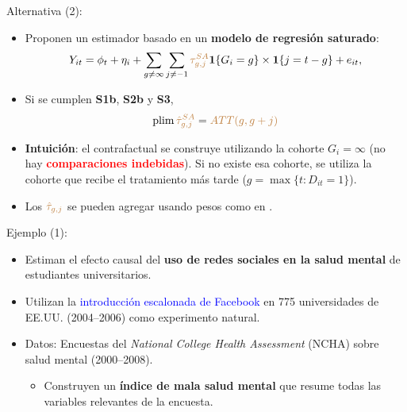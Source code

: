 \documentclass[10pt, xcolor=dvipsnames]{beamer}
\begin{document}
\begin{frame}{Alternativa (2): \citet{sun_estimating_2021}}
\begin{itemize}\setlength{\itemsep}{1em}
    \item  Proponen un estimador basado en un \textbf{modelo de regresión saturado}:
    \begin{align*}
        Y_{it} = \phi_t + \eta_i + \sum_{g \neq \infty} \sum_{j \neq -1} \textcolor{brown}{\tau^{SA}_{g,j}} \mathbf{1}\{G_i = g\} \times \mathbf{1}\{j=t-g\} + e_{it},
    \end{align*}	   
    \vspace{-1em}
    \item Si se cumplen \textbf{S1b}, \textbf{S2b} y \textbf{S3}, 
    \[
        \plim \textcolor{brown}{\hat \tau^{SA}_{g,j}} = \brown{ATT(g,g+j)}
    \]
    \vspace{-2em}
     \item \textbf{Intuición}: el contrafactual se construye utilizando la cohorte $G_i = \infty$ (no hay \textcolor{red}{\textbf{comparaciones indebidas}}). Si no existe esa cohorte, se utiliza la cohorte que recibe el tratamiento más tarde ($g = \max\{t : D_{it} = 1\}$).
    \item Los $\textcolor{brown}{\hat{\tau}_{g,j}}$ se pueden agregar usando pesos como en \citet{callaway_difference--differences_2020}.
\end{itemize}
\end{frame}

\begin{frame}{Ejemplo (1): \citet{BraghieriEtAl2022}}
\begin{itemize}\setlength{\itemsep}{1em}
    \item Estiman el efecto causal del \textbf{uso de redes sociales en la salud mental} de estudiantes universitarios.
    \item Utilizan la \textcolor{blue}{introducción escalonada de Facebook} en 775 universidades de EE.UU. (2004–2006) como experimento natural.
    \item Datos: Encuestas del \textit{National College Health Assessment} (NCHA) sobre salud mental (2000–2008).
    \vspace{0.5em}
    \begin{itemize}
        \item Construyen un \textbf{índice de mala salud mental} que resume todas las variables relevantes de la encuesta.
    \end{itemize}
\end{itemize}
\end{frame}
\end{document}
